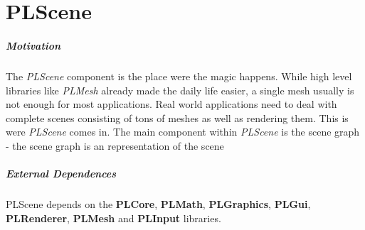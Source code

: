 \chapter{PLScene}


\paragraph{Motivation}
The \emph{PLScene} component is the place were the magic happens. While high level libraries like \emph{PLMesh} already made the daily life easier, a single mesh usually is not enough for most applications. Real world applications need to deal with complete scenes consisting of tons of meshes as well as rendering them. This is were \emph{PLScene} comes in. The main component within \emph{PLScene} is the scene graph - the scene graph is an representation of the scene


\paragraph{External Dependences}
PLScene depends on the \textbf{PLCore}, \textbf{PLMath}, \textbf{PLGraphics}, \textbf{PLGui}, \textbf{PLRenderer}, \textbf{PLMesh} and \textbf{PLInput} libraries.





\cleardoublepage
